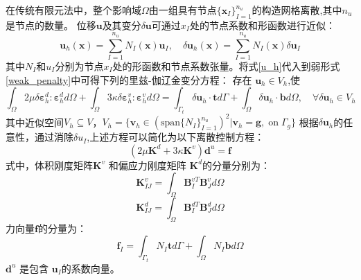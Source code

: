 在传统有限元法中，整个影响域$\Omega$由一组具有节点$\{\boldsymbol x_I\}_{I=1}^{n_u}$的构造网格离散\cite{hughes2000},其中$n_u$是节点的数量。
位移$\boldsymbol u$及其变分$\delta \boldsymbol u $可通过$x_I$处的节点系数和形函数进行近似：
\begin{equation}\label{u_h}
    \boldsymbol u_h(\boldsymbol x) = \sum_{I=1}^{n_u} N_I(\boldsymbol x) \boldsymbol u_I, \quad
    \delta \boldsymbol u_h(\boldsymbol x) = \sum_{I=1}^{n_u} N_I(\boldsymbol x) \delta \boldsymbol u_I
\end{equation}
其中$N_I$和$u_I$分别为节点$x_I$处的形函数和节点系数张量。将式\eqref{u_h}代入到弱形式\eqref{weak_penalty}中可得下列的里兹-伽辽金变分方程：
存在 $\boldsymbol u_h \in V_h$,使
\begin{equation}\label{ritz_penalty}
\int_\Omega 2\mu \delta \boldsymbol \varepsilon^d_h : \boldsymbol \varepsilon^d_h d\Omega +
\int_\Omega 3\kappa \delta \boldsymbol \varepsilon^v_h : \boldsymbol \varepsilon^v_h d\Omega =
\int_{\Gamma_t} \delta \boldsymbol u_h \cdot \boldsymbol t d\Gamma + \int_\Omega \delta \boldsymbol u_h \cdot \boldsymbol b d\Omega, \quad
\forall \delta \boldsymbol u_h \in V_h
\end{equation}
其中近似空间$V_h \subseteq V$，$V_h = \{\boldsymbol v_h \in (\mathrm{span}\{N_I\}_{I=1}^{n_u})^2 \vert \boldsymbol v_h = \boldsymbol g,\; \mathrm{on} \; \Gamma_g\}$
根据$\delta \boldsymbol u_h$的任意性，通过消除$\delta u_I$,上述方程可以简化为以下离散控制方程：
\begin{equation}\label{equilibrium_penalty}
    (2\mu\boldsymbol K^d + 3\kappa\boldsymbol K^v) \boldsymbol d^u = \boldsymbol f
\end{equation}
式中，体积刚度矩阵$\boldsymbol K^v$ 和偏应力刚度矩阵 $\boldsymbol K^d$的分量分别为：
\begin{equation}\label{stiffness_vol}
    \boldsymbol K^v_{IJ}= \int_{\Omega} \boldsymbol B^{vT}_I \boldsymbol B^v_J d\Omega
\end{equation}
\begin{equation}\label{stiffness_dev}
    \boldsymbol K^d_{IJ}= \int_{\Omega} \boldsymbol B^{dT}_I \boldsymbol B^d_J d\Omega
\end{equation}
力向量$\boldsymbol f$的分量为：
\begin{equation}
    \boldsymbol f_I = \int_{\Gamma_t} N_I \boldsymbol t d\Gamma + \int_{\Omega} N_I \boldsymbol b d\Omega
\end{equation}
$\boldsymbol d^u$ 是包含 $\boldsymbol u_I$的系数向量。

